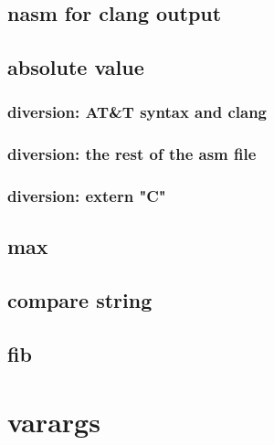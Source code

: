 

\subsection{nasm for clang output}



\subsection{absolute value}





\subsubsection{diversion: AT\&T syntax and clang}





\subsubsection{diversion: the rest of the asm file}


\subsubsection{diversion: extern "C"}



\subsection{max}

\subsection{compare string}

\subsection{fib}

\section{varargs}

